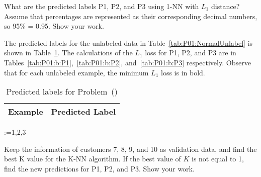 \FloatBarrier
\begin{subproblem}
  What are the predicted labels P1, P2, and P3 using 1-NN with $L_1$ distance? Assume that percentages are represented as their corresponding decimal numbers, so 95\% = 0.95. Show your work.
\end{subproblem}

The predicted labels for the unlabeled data in Table~\ref{tab:P01:NormalUnlabel} is shown in Table~\ref{tab:P01:b:PredictedLabels}.  The calculations of the $L_1$ loss for P1, P2, and P3 are in Tables~\ref{tab:P01:b:P1},~\ref{tab:P01:b:P2}, and~\ref{tab:P01:b:P3} respectively.  Observe that for each unlabeled example, the minimum $L_1$ loss is in bold.

\begin{table}[h]
  \centering
  \caption{Predicted labels for Problem~()}\label{tab:P01:b:PredictedLabels}
  \begin{tabular}{|c|c|}
    \hline
    Example & Predicted Label \\\hline\hline
    
  \end{tabular}
\end{table}

\@for\id:={1,2,3}

\FloatBarrier
\begin{subproblem}
  Keep the information of customers 7, 8, 9, and 10 as validation data, and find the best K value for the K-NN algorithm. If the best value of $K$ is not equal to 1, find the new predictions for P1, P2, and P3. Show your work.
\end{subproblem}


